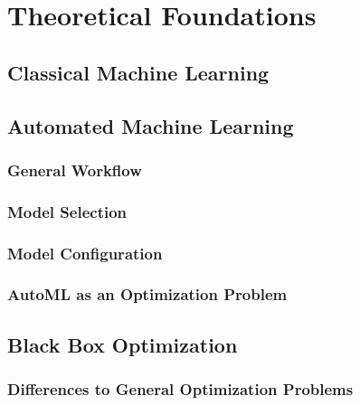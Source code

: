 %
\chapter{Theoretical Foundations}
\label{sec:theory}

\Blindtext

\section{Classical Machine Learning}
\label{sec:theory:ml}

\Blindtext


\section{Automated Machine Learning}
\label{sec:theory:automl}

\Blindtext

\subsection{General Workflow}
\label{sec:theory:automl:workflow}

\Blindtext

\subsection{Model Selection}
\label{sec:theory:automl:selection}

\Blindtext

\subsection{Model Configuration}
\label{sec:theory:automl:configuration}

\Blindtext

\subsection{AutoML as an Optimization Problem}
\label{sec:theory:automl:optimization}

\Blindtext


\section{Black Box Optimization}
\label{sec:theory:optimization}

\Blindtext

\subsection{Differences to General Optimization Problems}
\label{sec:theory:optimization:differences}


